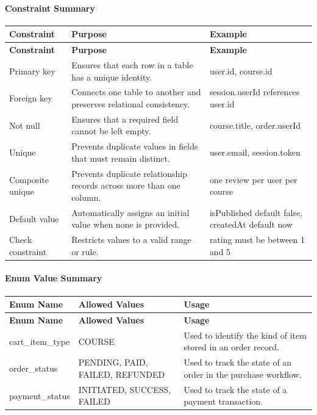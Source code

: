 \paragraph{Constraint Summary}
\begin{longtable}{L{3cm}L{6.8cm}L{3.9cm}}
\toprule
\textbf{Constraint} & \textbf{Purpose} & \textbf{Example} \\
\midrule
\endfirsthead
\toprule
\textbf{Constraint} & \textbf{Purpose} & \textbf{Example} \\
\midrule
\endhead
\bottomrule
\endfoot
Primary key & Ensures that each row in a table has a unique identity. & user.id, course.id \\
Foreign key & Connects one table to another and preserves relational consistency. & session.userId references user.id \\
Not null & Ensures that a required field cannot be left empty. & course.title, order.userId \\
Unique & Prevents duplicate values in fields that must remain distinct. & user.email, session.token \\
Composite unique & Prevents duplicate relationship records across more than one column. & one review per user per course \\
Default value & Automatically assigns an initial value when none is provided. & isPublished default false, createdAt default now \\
Check constraint & Restricts values to a valid range or rule. & rating must be between 1 and 5 \\
\end{longtable}

\paragraph{Enum Value Summary}
\begin{longtable}{L{3.3cm}L{5.8cm}L{4.6cm}}
\toprule
\textbf{Enum Name} & \textbf{Allowed Values} & \textbf{Usage} \\
\midrule
\endfirsthead
\toprule
\textbf{Enum Name} & \textbf{Allowed Values} & \textbf{Usage} \\
\midrule
\endhead
\bottomrule
\endfoot
cart\_item\_type & COURSE & Used to identify the kind of item stored in an order record. \\
order\_status & PENDING, PAID, FAILED, REFUNDED & Used to track the state of an order in the purchase workflow. \\
payment\_status & INITIATED, SUCCESS, FAILED & Used to track the state of a payment transaction. \\
\end{longtable}

\endgroup
